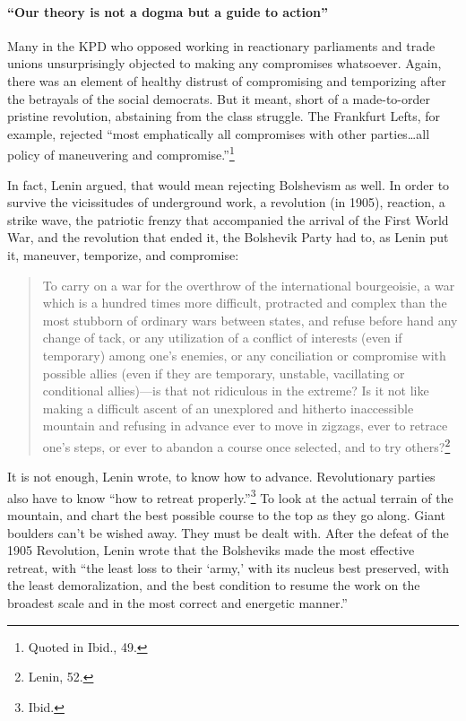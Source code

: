 \paragraph{``Our theory is not a dogma but a guide to action''}

Many in the KPD who opposed working in reactionary parliaments and trade unions unsurprisingly objected to making any compromises whatsoever. Again, there was an element of healthy distrust of compromising and temporizing after the betrayals of the social democrats. But it meant, short of a made-to-order pristine revolution, abstaining from the class struggle. The Frankfurt Lefts, for example, rejected ``most emphatically all compromises with other parties\ldots all policy of maneuvering and compromise.''\footnote{Quoted in Ibid., 49.}

In fact, Lenin argued, that would mean rejecting Bolshevism as well. In order to survive the vicissitudes of underground work, a revolution (in 1905), reaction, a strike wave, the patriotic frenzy that accompanied the arrival of the First World War, and the revolution that ended it, the Bolshevik Party had to, as Lenin put it, maneuver, temporize, and compromise:

\blockquote{To carry on a war for the overthrow of the international bourgeoisie, a war which is a hundred times more difficult, protracted and complex than the most stubborn of ordinary wars between states, and refuse before hand any change of tack, or any utilization of a conflict of interests (even if temporary) among one's enemies, or any conciliation or compromise with possible allies (even if they are temporary, unstable, vacillating or conditional allies)---is that not ridiculous in the extreme? Is it not like making a difficult ascent of an unexplored and hitherto inaccessible mountain and refusing in advance ever to move in zigzags, ever to retrace one's steps, or ever to abandon a course once selected, and to try others?\footnote{Lenin, 52.}}

It is not enough, Lenin wrote, to know how to advance. Revolutionary parties also have to know ``how to retreat properly.''\footnote{Ibid.} To look at the actual terrain of the mountain, and chart the best possible course to the top as they go along. Giant boulders can't be wished away. They must be dealt with. After the defeat of the 1905 Revolution, Lenin wrote that the Bolsheviks made the most effective retreat, with ``the least loss to their `army,' with its nucleus best preserved, with the least demoralization, and the best condition to resume the work on the broadest scale and in the most correct and energetic manner.''

